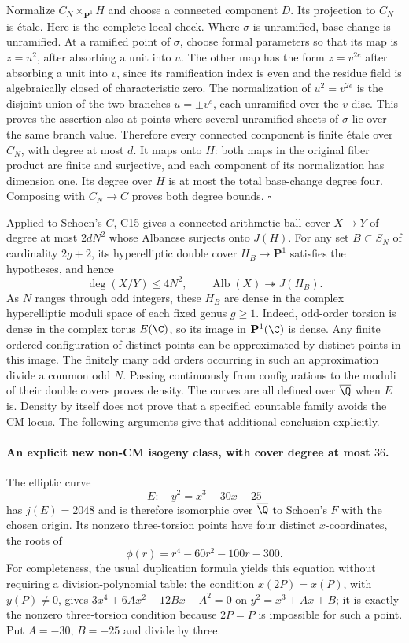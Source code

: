 Normalize $C_N\times_{\mathbf P^1}H$ and choose a connected component
$D$.  Its projection to $C_N$ is \'{e}tale.  Here is the complete local
check.  Where $\sigma$ is unramified, base change is unramified.  At a
ramified point of $\sigma$, choose formal parameters so that its map is
$z=u^2$, after absorbing a unit into $u$.  The other map has the form
$z=v^{2e}$ after absorbing a unit into $v$, since its ramification index
is even and the residue field is algebraically closed of characteristic
zero.  The normalization of $u^2=v^{2e}$ is the disjoint union of the
two branches $u=\pm v^e$, each unramified over the $v$-disc.  This proves
the assertion also at points where several unramified sheets of $\sigma$
lie over the same branch value.  Therefore every connected component is
finite \'{e}tale over $C_N$, with degree at most $d$.  It maps onto $H$:
both maps in the original fiber product are finite and surjective, and
each component of its normalization has dimension one.  Its degree over
$H$ is at most the total base-change degree four.  Composing with
$C_N\to C$ proves both degree bounds. \hfill$\square$

Applied to Schoen's $C$, C15 gives a connected arithmetic ball cover
$X\to Y$ of degree at most $2dN^2$ whose Albanese surjects onto $J(H)$.
For any set $B\subset S_N$ of cardinality $2g+2$, its hyperelliptic
double cover $H_B\to\mathbf P^1$ satisfies the hypotheses, and hence
\[
 \deg(X/Y)\leq4N^2,\qquad
 \operatorname{Alb}(X)\twoheadrightarrow J(H_B).
\]
As $N$ ranges through odd integers, these $H_B$ are dense in the complex
hyperelliptic moduli space of each fixed genus $g\geq1$.  Indeed, odd-order
torsion is dense in the complex torus $E(\C)$, so its image in
$\mathbf P^1(\C)$ is dense.  Any finite ordered configuration of distinct
points can be approximated by distinct points in this image.  The finitely
many odd orders occurring in such an approximation divide a common odd
$N$.  Passing continuously from configurations to the moduli of their
double covers proves density.  The curves are all defined over
$\overline{\Q}$ when $E$ is.  Density by itself does not prove that a
specified countable family avoids the CM locus.  The following arguments
give that additional conclusion explicitly.

\paragraph{An explicit new non-CM isogeny class, with cover degree at most $36$.}
The elliptic curve
\[
 E:\quad y^2=x^3-30x-25
\]
has $j(E)=2048$ and is therefore isomorphic over $\overline{\Q}$ to
Schoen's $F$ with the chosen origin.  Its nonzero three-torsion points have
four distinct $x$-coordinates, the roots of
\[
 \phi(r)=r^4-60r^2-100r-300.
\]
For completeness, the usual duplication formula yields this equation
without requiring a division-polynomial table: the condition
$x(2P)=x(P)$, with $y(P)\neq0$, gives
$3x^4+6Ax^2+12Bx-A^2=0$ on $y^2=x^3+Ax+B$; it is exactly the
nonzero three-torsion condition because $2P=P$ is impossible for such a
point.  Put $A=-30$, $B=-25$ and divide by three.

